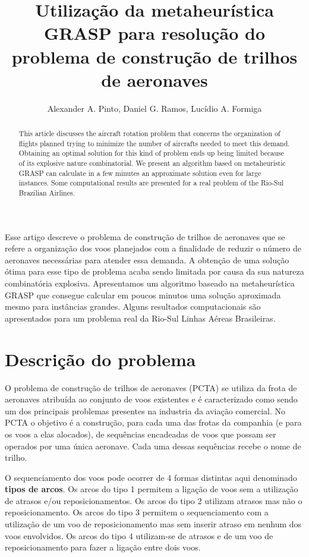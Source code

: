 \documentclass[12pt]{article}
\title{Utilização da metaheurística GRASP para resolução do problema de construção de trilhos de aeronaves}
\author{Alexander A. Pinto\inst{1}, Daniel G. Ramos\inst{1}, Lucídio A. Formiga\inst{1}}
\begin{document}
 

\maketitle

\begin{abstract}
This article discusses the aircraft rotation problem that
concerns the organization of flights planned trying to minimize the number of
aircrafts needed to meet this demand. Obtaining an optimal solution
for this kind of problem ends up being limited because of its explosive nature
combinatorial. We present an algorithm based on metaheuristic
GRASP can calculate in a few
minutes an approximate solution even for large instances. Some
computational results are presented for a real problem of the Rio-Sul Brazilian Airlines.

\end{abstract}
     
\begin{resumo} 
Esse artigo descreve o problema de construção de trilhos de aeronaves que se 
refere a organização dos voos planejados com a finalidade de reduzir o número
de aeronaves necessárias para atender essa demanda. A obtenção de uma solução
ótima para esse tipo de problema acaba sendo limitada por causa da sua natureza 
combinatória explosiva. Apresentamos um algoritmo baseado na metaheurística 
GRASP que consegue calcular em poucos 
minutos uma solução aproximada mesmo para instâncias grandes. Alguns 
resultados computacionais são apresentados para um problema real da Rio-Sul Linhas
Aéreas Brasileiras. 
\end{resumo}


\section{Descrição do problema}

O problema de construção de trilhos de aeronaves (PCTA) se utiliza da frota de aeronaves atribuída ao conjunto de voos existentes e é caracterizado como sendo um dos principais problemas presentes na industria da aviação comercial. No PCTA o objetivo é a construção, para cada uma das frotas da companhia (e para os voos a elas alocados), de sequências encadeadas de voos que possam ser operados por uma única aeronave\cite{abiliolivro}. Cada uma dessas sequências recebe o nome de trilho.

O sequenciamento dos voos pode ocorrer de 4 formas distintas aqui denominado \textbf{tipos de arcos}. Os arcos do tipo 1 permitem a ligação de voos sem a utilização de atrasos e/ou reposicionamentos. Os arcos do tipo 2 utilizam atrasos mas não o reposicionamento. Os arcos do tipo 3 permitem o sequenciamento com a utilização de um voo de reposicionamento mas sem inserir atraso em nenhum dos voos envolvidos. Os arcos do tipo 4 utilizam-se de atrasos e de um voo de reposicionamento para fazer a ligação entre dois voos.
\end{document}
